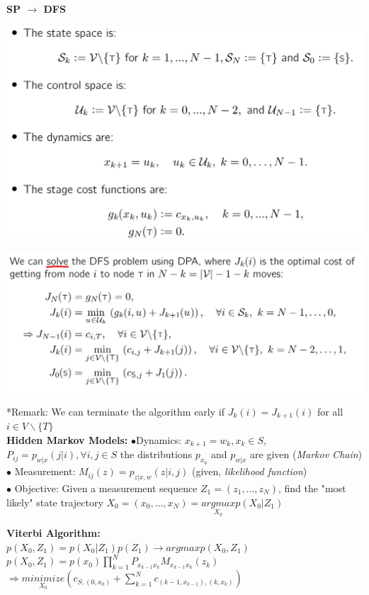 \documentclass[10pt,landscape]{article}
\newenvironment{Figure}
{\par\medskip\noindent\minipage{\linewidth}}
{\endminipage\par\medskip}
\begin{document}
\begin{multicols*}{4}
\textbf{SP $\rightarrow$ DFS}

\begin{Figure}
	\centering
	\includegraphics[width=\linewidth]{pictures/SP_DFS.png}
\end{Figure}
\begin{Figure}
	\centering
	\includegraphics[width=\linewidth]{pictures/SP_DFS_2.png}
\end{Figure}

*Remark: We can terminate the algorithm early if $J_k(i) = J_{k+1}(i)$ for all $i\in V \backslash \{T\}$\\


\textbf{Hidden Markov Models: }
$\bullet$Dynamics: $x_{k+1} = w_k, x_k \in S, $
$P_{ij} = p_{w|x}(j|i), \forall i,j \in S$
the distributions $p_{x_0}$ and $p_{w|x}$ are given (\textit{Markov Chain})\\
$\bullet$ Measurement: $M_{ij}(z) = p_{z|x,w}(z|i,j)$ (given, \textit{likelihood function})\\
$\bullet$ Objective: Given a measurement sequence $Z_1 = (z_1,...,z_N)$, find the "most likely" state trajectory $X_0=(x_0,...,x_N) = \underset{X_0}{argmax} p(X_0|Z_1)$

\textbf{Viterbi Algorithm: }\\
$p(X_0, Z_1) = p(X_0|Z_1)p(Z_1) \rightarrow argmax p(X_0,Z_1)$ \\
$p(X_0,Z_1) = p(x_0) \prod_{k=1}^{N} P_{x_{k-1}x_k}  M_{x_{k-1}x_k}(z_k)$\\
$\Longrightarrow \underset{X_0}{minimize}(c_{S,(0,x_0)} + \sum_{k=1}^{N} c_{(k-1,x_{k-1}), (k,x_k)})$\\



\end{multicols*}
\end{document}
